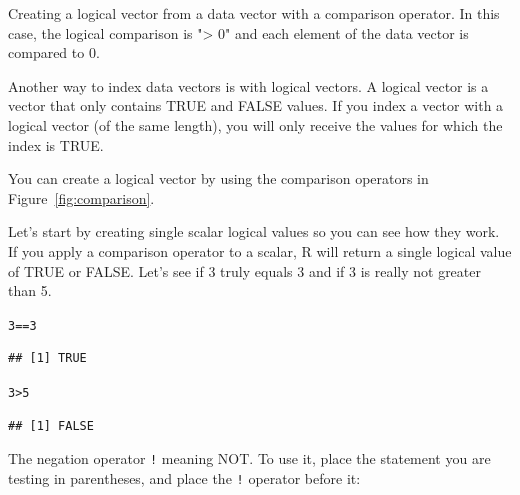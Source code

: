 \documentclass{tufte-book}\usepackage[]{graphicx}\usepackage[]{color}
\makeatletter
\newcommand{\hlnum}[1]{\textcolor[rgb]{0.686,0.059,0.569}{#1}}%
\newcommand{\hlopt}[1]{\textcolor[rgb]{0,0,0}{#1}}%
\newenvironment{kframe}{%
 \def\at@end@of@kframe{}%
 \ifinner\ifhmode%
  \def\at@end@of@kframe{\end{minipage}}%
  \begin{minipage}{\columnwidth}%
 \fi\fi%
 \def\FrameCommand##1{\hskip\@totalleftmargin \hskip-\fboxsep
 \colorbox{shadecolor}{##1}\hskip-\fboxsep
     \hskip-\linewidth \hskip-\@totalleftmargin \hskip\columnwidth}%
 \MakeFramed {\advance\hsize-\width
   \@totalleftmargin\z@ \linewidth\hsize
   \@setminipage}}%
 {\par\unskip\endMakeFramed%
 \at@end@of@kframe}
\newenvironment{knitrout}{}{} %
\makeatother
\begin{document}
\begin{footnotesize}
\begin{marginfigure}
\begin{tiny}
\begin{knitrout}
\end{knitrout}
\end{tiny}
\label{fig:logvec1}
\caption{Creating a logical vector from a data vector with a comparison operator. In this case, the logical comparison is "> 0" and each element of the data vector is compared to 0.}
\end{marginfigure}

Another way to index data vectors is with logical vectors. A logical vector is a vector that only contains TRUE and FALSE values. If you index a vector with a logical vector (of the same length), you will only receive the values for which the index is TRUE.

You can create a logical vector by using the comparison operators in Figure~\ref{fig:comparison}.

Let's start by creating single scalar logical values so you can see how they work. If you apply a comparison operator to a scalar, R will return a single logical value of TRUE or FALSE. Let's see if 3 truly equals 3 and if 3 is really not greater than 5.

\begin{footnotesize}
\begin{knitrout}
\color{fgcolor}\begin{kframe}
\begin{alltt}
\hlnum{3} \hlopt{==} \hlnum{3}
\end{alltt}
\begin{verbatim}
## [1] TRUE
\end{verbatim}
\begin{alltt}
\hlnum{3} \hlopt{>} \hlnum{5}
\end{alltt}
\begin{verbatim}
## [1] FALSE
\end{verbatim}
\end{kframe}
\end{knitrout}
\end{footnotesize}

The negation operator \texttt{!} meaning NOT. To use it, place the statement you are testing in parentheses, and place the \texttt{!} operator before it:


\end{footnotesize}
\end{document}
